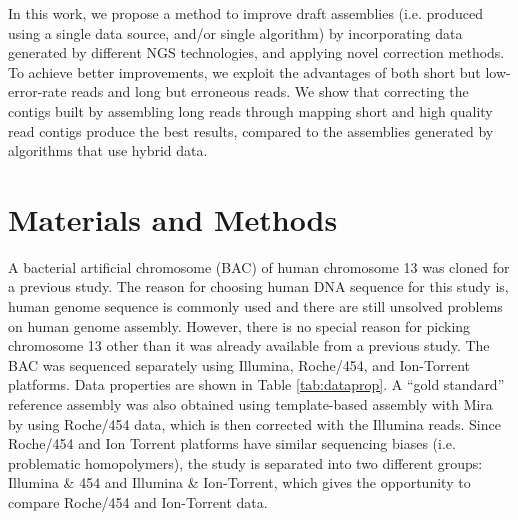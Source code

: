 \documentclass[12pt,a4paper]{cibb}
\begin{document}
In this work, we propose a method to improve draft assemblies (i.e. produced using a single data source, and/or single algorithm) by incorporating data generated by different NGS technologies, and applying novel correction methods. To achieve better improvements, we exploit the advantages of both short but low-error-rate reads and long but erroneous reads. 
We show that correcting the contigs built by assembling long reads through mapping short and high quality read contigs produce the best results, compared to the assemblies generated by algorithms that use hybrid data.

\section{\bf Materials and Methods}
\label{meth}

A bacterial artificial chromosome (BAC) of human chromosome 13 was cloned for a previous study. The reason for choosing human DNA sequence for this study is, human genome sequence is commonly used and there are still unsolved problems on human genome assembly. However, there is no special reason for picking chromosome 13 other than it was already available from a previous study. The BAC was sequenced separately using Illumina, Roche/454, and Ion-Torrent platforms. Data properties are shown in Table \ref{tab:dataprop}. A ``gold standard'' reference assembly was also obtained using template-based assembly with Mira~\cite{mira} by using Roche/454 data, which is then corrected with the Illumina reads. Since Roche/454 and Ion Torrent platforms have similar sequencing biases (i.e. problematic homopolymers), the study is separated into two different groups: Illumina \& 454 and Illumina \& Ion-Torrent, which gives the opportunity to compare Roche/454 and Ion-Torrent data.
\end{document}
